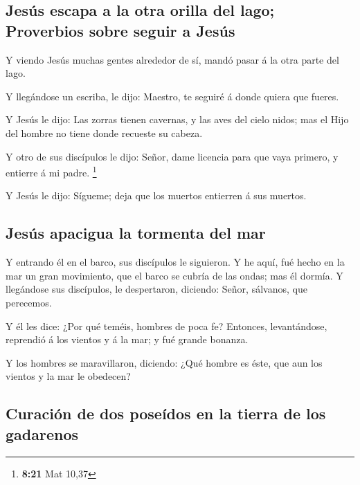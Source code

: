 \hypertarget{jesuxfas-escapa-a-la-otra-orilla-del-lago-proverbios-sobre-seguir-a-jesuxfas}{%
\subsection{Jesús escapa a la otra orilla del lago; Proverbios sobre
seguir a
Jesús}\label{jesuxfas-escapa-a-la-otra-orilla-del-lago-proverbios-sobre-seguir-a-jesuxfas}}

 Y viendo Jesús muchas gentes alrededor de sí, mandó pasar
á la otra parte del lago.

 Y llegándose un escriba, le dijo: Maestro, te seguiré á
donde quiera que fueres.

 Y Jesús le dijo: Las zorras tienen cavernas, y las aves
del cielo nidos; mas el Hijo del hombre no tiene donde recueste su
cabeza.

 Y otro de sus discípulos le dijo: Señor, dame licencia
para que vaya primero, y entierre á mi padre. \footnote{\textbf{8:21}
  Mat 10,37}

 Y Jesús le dijo: Sígueme; deja que los muertos entierren á
sus muertos.

\hypertarget{jesuxfas-apacigua-la-tormenta-del-mar}{%
\subsection{Jesús apacigua la tormenta del
mar}\label{jesuxfas-apacigua-la-tormenta-del-mar}}

 Y entrando él en el barco, sus discípulos le siguieron.
 Y he aquí, fué hecho en la mar un gran movimiento, que el
barco se cubría de las ondas; mas él dormía.  Y llegándose
sus discípulos, le despertaron, diciendo: Señor, sálvanos, que
perecemos.

 Y él les dice: ¿Por qué teméis, hombres de poca fe?
Entonces, levantándose, reprendió á los vientos y á la mar; y fué grande
bonanza.

 Y los hombres se maravillaron, diciendo: ¿Qué hombre es
éste, que aun los vientos y la mar le obedecen?

\hypertarget{curaciuxf3n-de-dos-poseuxeddos-en-la-tierra-de-los-gadarenos}{%
\subsection{Curación de dos poseídos en la tierra de los
gadarenos}\label{curaciuxf3n-de-dos-poseuxeddos-en-la-tierra-de-los-gadarenos}}

